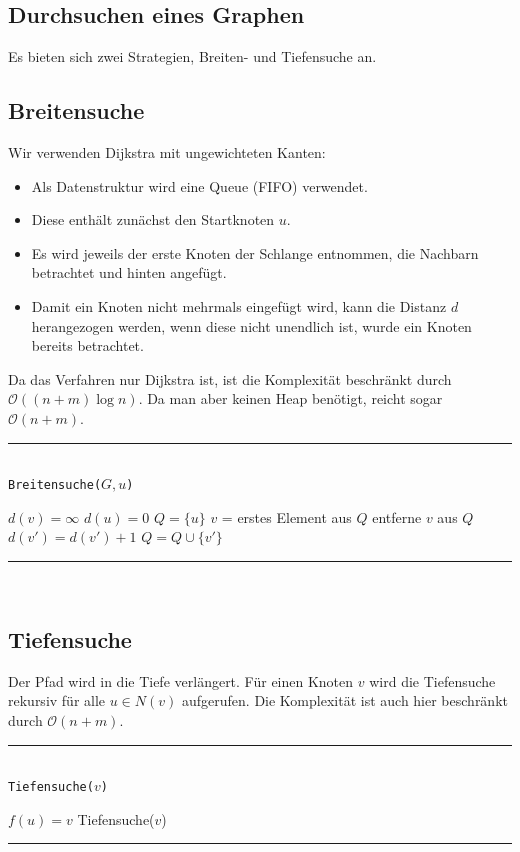 \documentclass[a4paper, 12pt]{article}
\begin{document}
	\subsection{Durchsuchen eines Graphen}
	Es bieten sich zwei Strategien, Breiten- und Tiefensuche an.
	\subsection{Breitensuche}
	Wir verwenden Dijkstra mit ungewichteten Kanten: \begin{itemize}
		\item Als Datenstruktur wird eine Queue (FIFO) verwendet.
		\item Diese enthält zunächst den Startknoten $u$.
		\item Es wird jeweils der erste Knoten der Schlange entnommen, die Nachbarn betrachtet und hinten angefügt.
		\item Damit ein Knoten nicht mehrmals eingefügt wird, kann die Distanz $d$ herangezogen werden, wenn diese nicht unendlich ist, wurde ein Knoten bereits betrachtet.
	\end{itemize}
	Da das Verfahren nur Dijkstra ist, ist die Komplexität beschränkt durch $\mathcal{O}((n+m)\log n)$. Da man aber keinen Heap benötigt, reicht sogar $\mathcal{O}(n+m)$.
	\par\noindent\rule{\textwidth}{0.4pt}\\
	\texttt{Breitensuche($G,u$)}
	\begin{algorithmic}[1]
		\State $d(v) = \infty$
		\EndFor
		\State $d(u) = 0$
		\State $Q = \{u\}$
		\State $v$ = erstes Element aus $Q$
		\State entferne $v$ aus $Q$
		\State $d(v') = d(v')+1$
		\State $Q = Q\cup \{v'\}$
		\EndIf
		\EndFor
		\EndWhile
	\end{algorithmic}
	\par\noindent\rule{\textwidth}{0.4pt}\\
	\subsection{Tiefensuche}
	Der Pfad wird in die Tiefe verlängert. Für einen Knoten $v$ wird die Tiefensuche rekursiv für alle $u \in N(v)$ aufgerufen. Die Komplexität ist auch hier beschränkt durch $\mathcal{O}(n+m)$.
	\par\noindent\rule{\textwidth}{0.4pt}\\
	\texttt{Tiefensuche($v$)}
	\begin{algorithmic}[1]
		\State $f(u) = v$
		Tiefensuche($v$)
		\EndIf
		\EndFor
	\end{algorithmic}
	\par\noindent\rule{\textwidth}{0.4pt}\\
\end{document}
